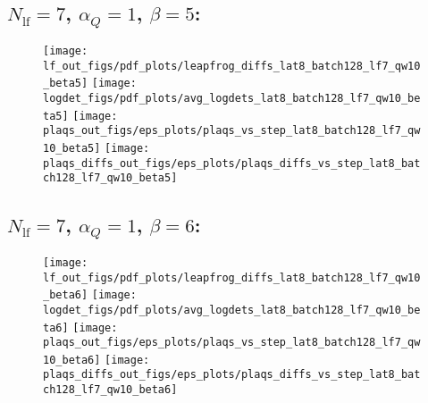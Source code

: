\clearpage
\subsection{\texorpdfstring{$N_{\mathrm{lf}} = 7$}{Nlf = 7}, \texorpdfstring{$\alpha_Q = 1$}{alphaq = 1},
\texorpdfstring{$\beta = 5$}{beta = 5}:}
%
\begin{figure}[htpb]
  \centering
  \texttt{[image: lf\_out\_figs/pdf\_plots/leapfrog\_diffs\_lat8\_batch128\_lf7\_qw10\_beta5]}
  \hfill
  \texttt{[image: logdet\_figs/pdf\_plots/avg\_logdets\_lat8\_batch128\_lf7\_qw10\_beta5]}
  \hfill
  \texttt{[image: plaqs\_out\_figs/eps\_plots/plaqs\_vs\_step\_lat8\_batch128\_lf7\_qw10\_beta5]}
  \hfill
  \texttt{[image: plaqs\_diffs\_out\_figs/eps\_plots/plaqs\_diffs\_vs\_step\_lat8\_batch128\_lf7\_qw10\_beta5]}
\end{figure}

\clearpage
\subsection{\texorpdfstring{$N_{\mathrm{lf}} = 7$}{Nlf = 7}, \texorpdfstring{$\alpha_Q = 1$}{alphaq = 1},
\texorpdfstring{$\beta = 6$}{beta = 6}:}
%
\begin{figure}[htpb]
  \centering
  \texttt{[image: lf\_out\_figs/pdf\_plots/leapfrog\_diffs\_lat8\_batch128\_lf7\_qw10\_beta6]}
  \hfill
  \texttt{[image: logdet\_figs/pdf\_plots/avg\_logdets\_lat8\_batch128\_lf7\_qw10\_beta6]}
  \hfill
  \texttt{[image: plaqs\_out\_figs/eps\_plots/plaqs\_vs\_step\_lat8\_batch128\_lf7\_qw10\_beta6]}
  \hfill
  \texttt{[image: plaqs\_diffs\_out\_figs/eps\_plots/plaqs\_diffs\_vs\_step\_lat8\_batch128\_lf7\_qw10\_beta6]}
\end{figure}


